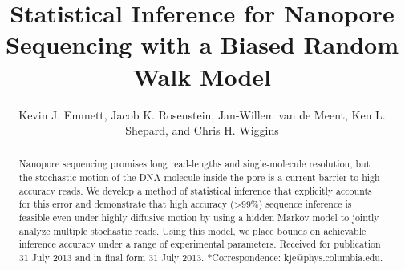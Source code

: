 \documentclass{biophys_letter}
\title{Statistical Inference for Nanopore Sequencing with a Biased Random Walk Model}
\author{Kevin J. Emmett,{\authdag *} Jacob K. Rosenstein,{\authpar} Jan-Willem van de Meent,{\authddag} Ken L. Shepard,{\addrS} and Chris H. Wiggins{\authddag}}
\begin{document}
\setcounter{page}{1} %

\pagestyle{headings}

\maketitle


\begin{abstract}
{Nanopore sequencing promises long read-lengths and single-molecule resolution, but the stochastic motion of the DNA molecule inside the pore is a current barrier to high accuracy reads.
We develop a method of statistical inference that explicitly accounts for this error and demonstrate that high accuracy (\textgreater 99\%) sequence inference is feasible even under highly diffusive motion by using a hidden Markov model to jointly analyze multiple stochastic reads.
Using this model, we place bounds on achievable inference accuracy under a range of experimental parameters.}
{Received for publication 31 July 2013 and in final form 31 July 2013.}
{*Correspondence: kje@phys.columbia.edu.}
\end{abstract}
\end{document}

